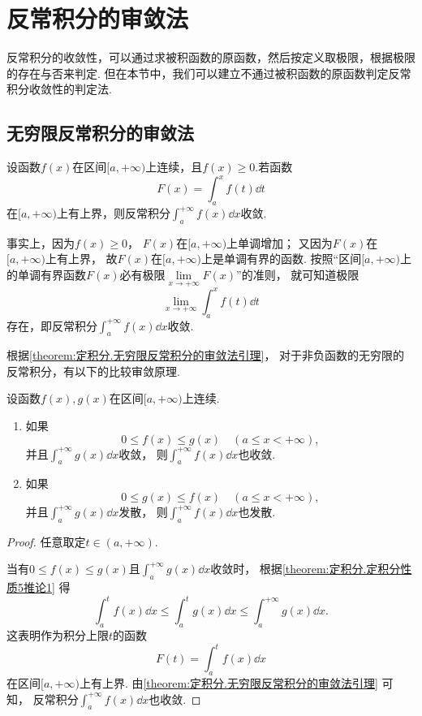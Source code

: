 \section{反常积分的审敛法}
反常积分的收敛性，可以通过求被积函数的原函数，然后按定义取极限，根据极限的存在与否来判定.
但在本节中，我们可以建立不通过被积函数的原函数判定反常积分收敛性的判定法.

\subsection{无穷限反常积分的审敛法}
\begin{theorem}\label{theorem:定积分.无穷限反常积分的审敛法引理}
设函数\(f(x)\)在区间\([a,+\infty)\)上连续，且\(f(x) \geq 0\).若函数\[
F(x)=\int_a^x f(t) \dd{t}
\]在\([a,+\infty)\)上有上界，则反常积分\(\int_a^{+\infty} f(x) \dd{x}\)收敛.
\end{theorem}
事实上，因为\(f(x)\geq0\)，
\(F(x)\)在\([a,+\infty)\)上单调增加；
又因为\(F(x)\)在\([a,+\infty)\)上有上界，
故\(F(x)\)在\([a,+\infty)\)上是单调有界的函数.
按照“区间\([a,+\infty)\)上的单调有界函数\(F(x)\)必有极限\(\lim\limits_{x\to+\infty} F(x)\)”的准则，
就可知道极限\[
	\lim\limits_{x\to+\infty} \int_a^x f(t) \dd{t}
\]存在，即反常积分\(\int_a^{+\infty} f(x) \dd{x}\)收敛.

根据\cref{theorem:定积分.无穷限反常积分的审敛法引理}，
对于非负函数的无穷限的反常积分，有以下的比较审敛原理.
\begin{theorem}[比较审敛原理]\label{theorem:定积分.无穷限反常积分的比较审敛原理}
设函数\(f(x),g(x)\)在区间\([a,+\infty)\)上连续.
\begin{enumerate}
	\item 如果\[
		0 \leq f(x) \leq g(x)
		\quad (a \leq x < +\infty),
	\]并且\(\int_a^{+\infty} g(x) \dd{x}\)收敛，
	则\(\int_a^{+\infty} f(x) \dd{x}\)也收敛.

	\item 如果\[
		0 \leq g(x) \leq f(x)
		\quad (a \leq x < +\infty),
	\]
	并且\(\int_a^{+\infty} g(x) \dd{x}\)发散，
	则\(\int_a^{+\infty} f(x) \dd{x}\)也发散.
\end{enumerate}
\begin{proof}
任意取定\(t \in (a,+\infty)\).

当有\(0 \leq f(x) \leq g(x)\)且\(\int_a^{+\infty} g(x) \dd{x}\)收敛时，
根据\cref{theorem:定积分.定积分性质5推论1}
得\[
	\int_a^t f(x) \dd{x}
	\leq
	\int_a^t g(x) \dd{x}
	\leq
	\int_a^{+\infty} g(x) \dd{x}.
\]
这表明作为积分上限\(t\)的函数\[
	F(t) = \int_a^t f(x) \dd{x}
\]
在区间\([a,+\infty)\)上有上界.
由\cref{theorem:定积分.无穷限反常积分的审敛法引理} 可知，
反常积分\(\int_a^{+\infty} f(x) \dd{x}\)也收敛.
\end{proof}
\end{theorem}

